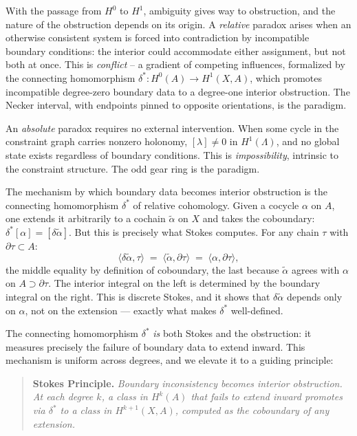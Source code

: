 \documentclass[11pt]{amsart}  %
\theoremstyle{plain}
\theoremstyle{definition}
\theoremstyle{remark}
\newcommand{\style}[1]{{\em #1}} %
\newcommand{\coboundary}{\delta} %
\newcommand{\connecting}{\delta^*} %
\newcommand{\cgraph}{\Lambda} %
\newcommand{\coupling}{\lambda} %
\begin{document}
With the passage from $H^0$ to $H^1$, ambiguity gives way to obstruction, 
and the nature of the obstruction depends on its origin. A 
\style{relative} paradox arises when an otherwise consistent system is forced 
into contradiction by incompatible boundary conditions: the interior could 
accommodate either assignment, but not both at once. This is \style{conflict} -- 
a gradient of competing influences, formalized by the connecting homomorphism 
$\connecting: H^0(A) \to H^1(X, A)$, which promotes incompatible degree-zero 
boundary data to a degree-one interior obstruction. The Necker interval, 
with endpoints pinned to opposite orientations, is the paradigm.

An \style{absolute} paradox requires no external intervention. When some 
cycle in the constraint graph carries nonzero holonomy, $[\coupling] \neq 0$ 
in $H^1(\cgraph)$, and no global state exists regardless of boundary 
conditions. This is \style{impossibility}, intrinsic to the constraint 
structure. The odd gear ring is the paradigm.

The mechanism by which boundary data becomes interior obstruction is 
the connecting homomorphism $\connecting$ of relative cohomology. Given 
a cocycle $\alpha$ on $A$, one extends it arbitrarily to a cochain 
$\tilde\alpha$ on $X$ and takes the coboundary: 
$\connecting[\alpha] = [\coboundary\tilde\alpha]$. But this is precisely 
what Stokes computes. For any chain $\tau$ with $\partial\tau \subset A$:
\[
\langle \coboundary\tilde\alpha, \tau \rangle 
\;=\; \langle \tilde\alpha, \partial\tau \rangle
\;=\; \langle \alpha, \partial\tau \rangle,
\]
the middle equality by definition of coboundary, the last because 
$\tilde\alpha$ agrees with $\alpha$ on $A \supset \partial\tau$. The 
interior integral on the left is determined by the boundary integral 
on the right. This is discrete Stokes, and it shows that 
$\coboundary\tilde\alpha$ depends only on $\alpha$, not on the 
extension --- exactly what makes $\connecting$ well-defined.

The connecting homomorphism $\delta^*$ {\em is} both Stokes and the obstruction: 
it measures precisely the failure of boundary data to extend inward. 
This mechanism is uniform across degrees, and we elevate it to a guiding principle:

\begin{quote}
\textbf{Stokes Principle.} \emph{Boundary inconsistency becomes interior 
obstruction. At each degree $k$, a class in $H^k(A)$ that fails to extend 
inward promotes via $\connecting$ to a class in $H^{k+1}(X, A)$, computed 
as the coboundary of any extension.} 
\end{quote}
\end{document}
